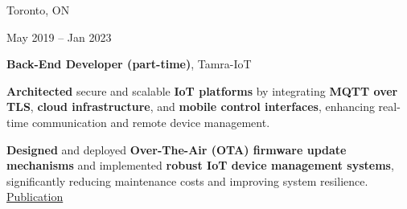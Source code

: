 
     \vspace{0.1 cm}
\begin{twocolentry}{
            Toronto, ON

        May 2019 – Jan 2023
        }
            \textbf{Back-End Developer (part-time)}, Tamra-IoT
      \begin{highlights}
    \item \textbf{Architected} secure and scalable \textbf{IoT platforms} by integrating \textbf{MQTT over TLS}, \textbf{cloud infrastructure}, and \textbf{mobile control interfaces}, enhancing real-time communication and remote device management.

    \item \textbf{Designed} and deployed \textbf{Over-The-Air (OTA) firmware update mechanisms} and implemented \textbf{robust IoT device management systems}, significantly reducing maintenance costs and improving system resilience. \href{https://ieeexplore.ieee.org/abstract/document/9824989}{Publication}
\end{highlights}

        \end{twocolentry}




  

